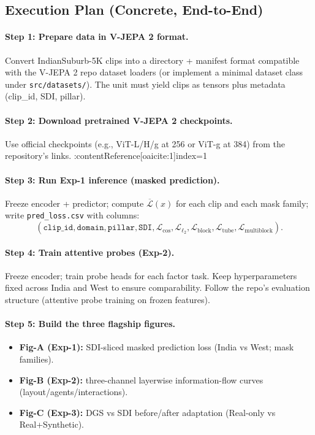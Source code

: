 \subsection{Execution Plan (Concrete, End-to-End)}
\label{sec:execution_plan}

\paragraph{Step 1: Prepare data in V-JEPA 2 format.}
Convert IndianSuburb-5K clips into a directory + manifest format compatible with the V-JEPA 2 repo dataset loaders (or implement a minimal dataset class under \texttt{src/datasets/}). The unit must yield clips as tensors plus metadata (clip\_id, SDI, pillar).

\paragraph{Step 2: Download pretrained V-JEPA 2 checkpoints.}
Use official checkpoints (e.g., ViT-L/H/g at 256 or ViT-g at 384) from the repository’s links. :contentReference[oaicite:1]{index=1}

\paragraph{Step 3: Run Exp-1 inference (masked prediction).}
Freeze encoder + predictor; compute $\overline{\mathcal{L}}(x)$ for each clip and each mask family; write \texttt{pred\_loss.csv} with columns:
\[
(\texttt{clip\_id}, \texttt{domain}, \texttt{pillar}, \texttt{SDI}, \mathcal{L}_{\cos}, \mathcal{L}_{\ell_2}, \mathcal{L}_{\mathrm{block}}, \mathcal{L}_{\mathrm{tube}}, \mathcal{L}_{\mathrm{multiblock}}).
\]

\paragraph{Step 4: Train attentive probes (Exp-2).}
Freeze encoder; train probe heads for each factor task. Keep hyperparameters fixed across India and West to ensure comparability. Follow the repo’s evaluation structure (attentive probe training on frozen features). 

\paragraph{Step 5: Build the three flagship figures.}
\begin{itemize}[leftmargin=*,itemsep=2pt]
  \item \textbf{Fig-A (Exp-1):} SDI-sliced masked prediction loss (India vs West; mask families).
  \item \textbf{Fig-B (Exp-2):} three-channel layerwise information-flow curves (layout/agents/interactions).
  \item \textbf{Fig-C (Exp-3):} DGS vs SDI before/after adaptation (Real-only vs Real+Synthetic).
\end{itemize}

